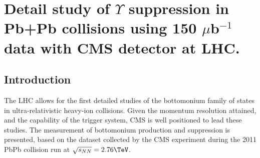 \chapter{Detail study of $\Upsilon$ suppression in Pb+Pb collisions using 150 $\mu$b$^{-1}$ data with CMS detector at LHC.} 
\label{chap:UpsilonProductionPbPb2011}

\section{Introduction}
\label{sec:introduction}
The LHC allows for the first detailed studies of the bottomonium family of states in ultra-relativistic 
heavy-ion collisions. Given the momentum resolution attained, and the capability of the trigger system,  
CMS is well positioned to lead these studies. The measurement of bottomonium production and suppression is 
presented, based on the dataset collected by the CMS experiment during the 2011 PbPb collision run at  $\sqrtsnn = 2.76\TeV$. 

